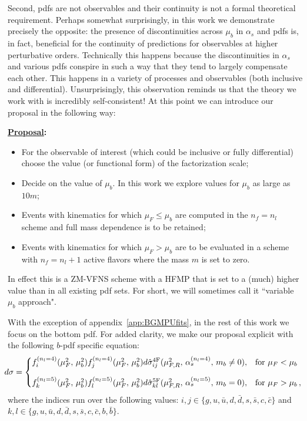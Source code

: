 \documentclass[letter,11pt]{article}
\def\as{\alpha_s}
\newcommand{\muF}{\mu_F}
\def\nf{{n_f}}
\def\nl{{n_l}}
\def\mub{\mu_b}
\begin{document}
Second, pdfs are not observables and their continuity is not a formal theoretical requirement. Perhaps somewhat surprisingly, in this work we demonstrate precisely the opposite: the presence of discontinuities across $\mub$ in $\as$ and pdfs is, in fact, beneficial for the continuity of predictions for observables at higher perturbative orders. Technically this happens because the discontinuities in $\as$ and various pdfs conspire in such a way that they tend to largely compensate each other. This happens in a variety of processes and observables (both inclusive and differential). Unsurprisingly, this observation reminds us that the theory we work with is incredibly self-consistent! At this point we can introduce our proposal in the following way: 

\centerline{\bf \underline{Proposal}:}
%
\begin{itemize}
\item For the observable of interest (which could be inclusive or fully differential) choose the value (or functional form) of the factorization scale;
\item Decide on the value of $\mub$. In this work we explore values for $\mub$ as large as $10 m$;
\item Events with kinematics for which $\muF\leq\mub$ are computed in the $\nf=\nl$ scheme and full mass dependence is to be retained;
\item Events with kinematics for which $\muF > \mub$ are to be evaluated in a scheme with $\nf=\nl+1$ active flavors where the mass $m$ is set to zero.
\end{itemize}
%
In effect this is a ZM-VFNS scheme with a HFMP that is set to a (much) higher value than in all existing pdf sets. For short, we will sometimes call it ``variable $\mub$ approach".

With the exception of appendix~\ref{app:BGMPUfits}, in the rest of this work we focus on the bottom pdf. For added clarity, we make our proposal explicit with the following $b$-pdf specific equation:
%
\begin{equation}
\hskip -2mm
d\sigma =
\begin{cases}
f^{(n_l=4)}_i(\mu_F^2,\, \mub^2) f^{(n_l=4)}_j(\mu_F^2,\, \mub^2) d\hat\sigma_{ij}^{\rm 4F}(\mu_{F,R}^2,\,\as^{(\nl=4)},\,m_b\neq0), &\text{for $\mu_F < \mub$}
\\[10pt]
f^{(n_l=5)}_k(\mu_F^2,\, \mub^2) f^{(n_l=5)}_l(\mu_F^2,\, \mub^2) d\hat\sigma_{kl}^{\rm 5F}(\mu_{F,R}^2,\,\as^{(n_l=5)},\,m_b=0), &\text{for $\mu_F > \mub$}\,,
\end{cases}
\end{equation}
%
where the indices run over the following values: $i,j \in \{g,u,\bar{u},d,\bar{d},s,\bar{s},c,\bar{c}\}$ and $k,l \in \{g,u,\bar{u},d,\bar{d},s,\bar{s},c,\bar{c},b,\bar{b}\}$. 
\end{document}
